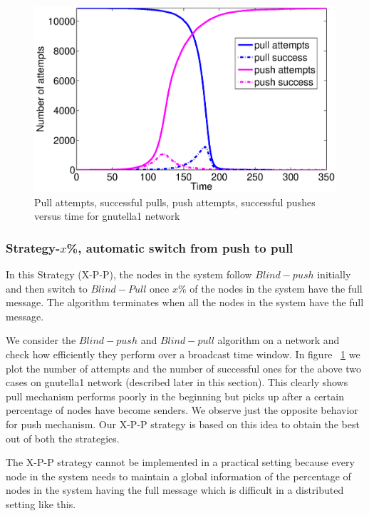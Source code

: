 \begin{figure}
\centering
\includegraphics[scale=0.25]{./texfiles/Chapter_3/netsci/figs1/ps_pl_at_su.eps}
\caption{Pull attempts, successful pulls, push attempts, successful pushes versus time for gnutella1 network\vspace{4mm}}
\label{ps_pl_at_su}
\end{figure}

\subsubsection{Strategy-$x$\%, automatic switch from push to pull}

In this Strategy (X-P-P), the nodes in the system follow $Blind-push$ initially and then switch to $Blind-Pull$ once $x$\% of the nodes in the system have 
the full message. The algorithm terminates when all the nodes in the system have the full message.

We consider the $Blind-push$ and $Blind-pull$ algorithm on a network and check how efficiently they perform over a broadcast time window. 
In figure ~\ref{ps_pl_at_su} we plot the number of attempts and the number of successful ones for the above two cases on 
  gnutella1 network (described later in this section). 
  This clearly shows pull mechanism  
  performs poorly in the beginning but picks up after a certain percentage of nodes have become senders. We observe just the opposite behavior 
  for push mechanism. Our X-P-P strategy is based on this idea to obtain the best out of both the strategies.

The X-P-P strategy cannot be implemented in a practical setting  because every node in the system needs to maintain a global information of the percentage of nodes in the 
system having the full message which is difficult in a distributed setting like this.



